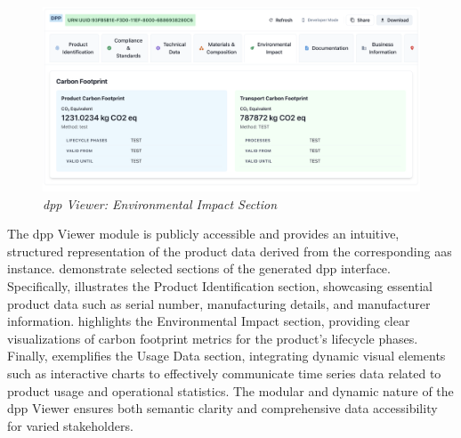 \begin{figure}[H]
  \centering
  \includegraphics[width=\textwidth]{figures/pilot_interface_9.png}
  \caption{%
    \textit{\ac{dpp} Viewer: Environmental Impact Section} 
  }
  \label{fig:pilot_interface_9}
\end{figure}

The \ac{dpp} Viewer module is publicly accessible and provides an intuitive, structured representation of the product data derived from the corresponding \ac{aas} instance.  demonstrate selected sections of the generated \acrlong{dpp} interface. Specifically,  illustrates the Product Identification section, showcasing essential product data such as serial number, manufacturing details, and manufacturer information.  highlights the Environmental Impact section, providing clear visualizations of carbon footprint metrics for the product's lifecycle phases. Finally,  exemplifies the Usage Data section, integrating dynamic visual elements such as interactive charts to effectively communicate time series data related to product usage and operational statistics. The modular and dynamic nature of the \ac{dpp} Viewer ensures both semantic clarity and comprehensive data accessibility for varied stakeholders.